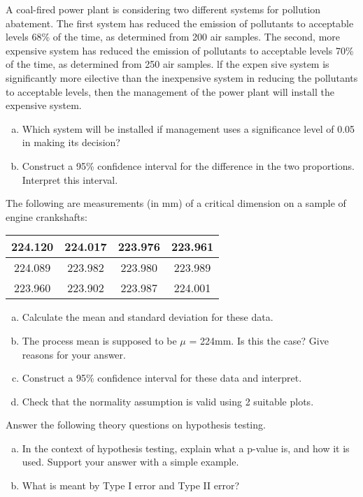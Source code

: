 
\item 
A coal-fired power plant is considering two different systems for pollution abatement.
The first system has reduced the emission of pollutants to acceptable levels 68\% of the time,
as determined from 200 air samples. The second, more expensive system has reduced the
emission of
pollutants to acceptable levels 70\% of the time, as determined from 250 air samples. lf the
expen sive system is significantly more eilective than the inexpensive system in reducing the
pollutants to acceptable levels, then the management of the power plant will install the
expensive system.

\begin{enumerate}[(a)]
\item Which system will be installed if management uses a significance level of 0.05 in making
its decision?
\item Construct a 95\% confidence interval for the difference in the two proportions. Interpret
this interval.
\end{enumerate}


\item The following are measurements (in mm) of a critical
dimension on a sample of engine crankshafts:
\begin{center}
\begin{tabular}{|c|c|c|c|} \hline
224.120 & 224.017 & 223.976 & 223.961 \\ \hline
224.089 & 223.982 & 223.980 & 223.989  \\ \hline
223.960 & 223.902  & 223.987 & 224.001  \\ \hline
\end{tabular}
\end{center}

\begin{enumerate}[(a)]
\item Calculate the mean and standard deviation for these data.
\item The process mean is supposed to be $\mu$ = 224mm. Is this the
case? Give reasons for your answer.\\
\item Construct a 95\% confidence interval for these data and
interpret.\\
\item Check that the normality assumption is valid using 2 suitable
plots.
\end{enumerate}


\item Answer the following theory questions on hypothesis testing.
\begin{enumerate}[(a)]
\item In the context of hypothesis testing, explain what a p-value is, and how it is used. Support your answer with a simple example.
\item What is meant by Type I error and Type II error?
\end{enumerate}



